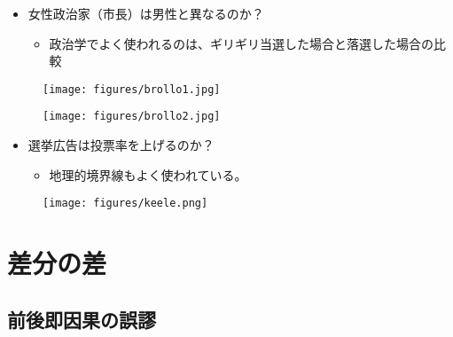 \documentclass[
  xelatex,
  ja=standard]{bxjsarticle}
\providecommand{\tightlist}{%
  \setlength{\itemsep}{0pt}\setlength{\parskip}{0pt}}\usepackage{longtable,booktabs,array}
\begin{document}
\begin{itemize}
\tightlist
\item
  女性政治家（市長）は男性と異なるのか？

  \begin{itemize}
  \tightlist
  \item
    政治学でよく使われるのは、ギリギリ当選した場合と落選した場合の比較
  \end{itemize}
\end{itemize}

\begin{figure}[htpb]

{\centering \texttt{[image: figures/brollo1.jpg]}

}

\caption{\citet{brollo2016}}

\end{figure}

\begin{figure}[htpb]

{\centering \texttt{[image: figures/brollo2.jpg]}

}

\caption{\citet{brollo2016}}

\end{figure}

\begin{itemize}
\tightlist
\item
  選挙広告は投票率を上げるのか？

  \begin{itemize}
  \tightlist
  \item
    地理的境界線もよく使われている。
  \end{itemize}
\end{itemize}

\begin{figure}[htpb]

{\centering \texttt{[image: figures/keele.png]}

}

\caption{\citet{keele2015}}

\end{figure}

\hypertarget{ux5deeux5206ux306eux5dee}{%
\section{差分の差}\label{ux5deeux5206ux306eux5dee}}

\hypertarget{ux524dux5f8cux5373ux56e0ux679cux306eux8aa4ux8b2c}{%
\subsection{前後即因果の誤謬}\label{ux524dux5f8cux5373ux56e0ux679cux306eux8aa4ux8b2c}}
\end{document}
